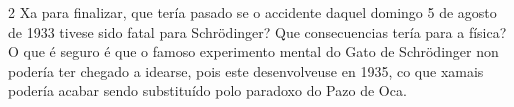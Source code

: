 \begin{multicols}{2}
Xa para finalizar, que tería pasado se o accidente daquel domingo 5 de agosto
de 1933 tivese sido fatal para Schrödinger? Que consecuencias tería para a
física? O que é seguro é que o famoso experimento mental do Gato de Schrödinger
non podería ter chegado a idearse, pois este desenvolveuse en 1935, co que
xamais podería acabar sendo substituído polo paradoxo do Pazo de Oca.

\nocite{galan1}
\nocite{galan2}
\nocite{galan3}

\printbibliography

\end{multicols}

